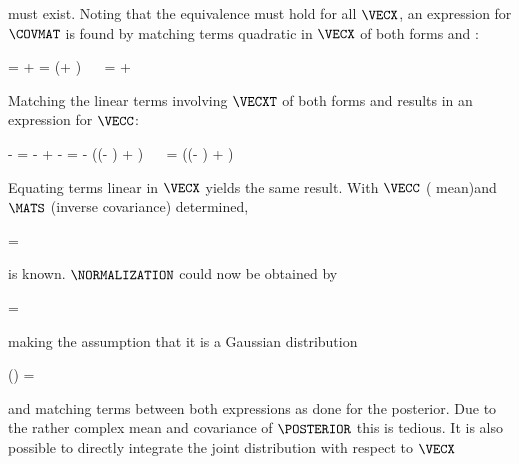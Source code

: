         must exist. Noting that the equivalence must hold for all $\VECX$, an
        expression for $\COVMAT$ is found by matching terms quadratic in
        $\VECX$ of both forms  and
        :

        \startformula
        \startalign[n=3,align={left,right,left}]
            \NC \NC \VECXT \MATS \VECX = \NC
                \VECXT \MATBT \MATQ \MATB \VECX + \VECXT \MATP \VECX \NR
            \NC \NC = \NC
                \VECXT (\MATBT \MATQ \MATB + \MATP) \VECX \NR
            \NC \Rightarrow~~ \NC \MATS = \NC
                \MATBT \MATQ \MATB + \MATP
                \EQSTOP
        \stopalign
        \stopformula

        Matching the linear terms involving $\VECXT$ of both forms
         and 
        results in an expression for $\VECC$:

        \startformula
        \startalign[n=3,align={left,right,left}]
            \NC \NC - \VECXT \MATS \VECC = \NC
                - \VECXT \MATBT \MATQ \VECY
                + \VECXT \MATBT \MATQ \VECB
                - \VECXT \MATP \VECA \NR
            \NC \NC  = \NC
                - \VECXT (\MATBT \MATQ (\VECY - \VECB) + \MATP \VECA) \NR
            \NC \Rightarrow~~ \NC \VECC = \NC
                \MATSI (\MATBT \MATQ (\VECY - \VECB) + \MATP \VECA) \EQSTOP \NR
        \stopalign
        \stopformula

        Equating terms linear in $\VECX$ yields the same result. With $\VECC$
        ( mean)and $\MATS$ (inverse covariance) determined,

        \placeformula[eq:gaussbayespost]
        \startformula
            \POSTERIOR = \GAUSS{\VECX}{\MATSI(\MATBT \MATQ (\VECY - \VECB) + \MATP \VECA)}{\MATSI}
        \stopformula

        is known. $\NORMALIZATION$ could now be obtained by

        \startformula
            \NORMALIZATION = \frac{\JOINT}{\POSTERIOR} \EQCOMMA
        \stopformula

        making the assumption that it is a Gaussian distribution

         \ln(\NORMALIZATION) = \GAUSSEXP{\VECY}{\VECD}{\MATT}
        \stopformula

        and matching terms between both expressions as done for the posterior.
        Due to the rather complex mean and covariance of $\POSTERIOR$ this is
        tedious. It is also possible to directly integrate the joint
        distribution with respect to $\VECX$
        
